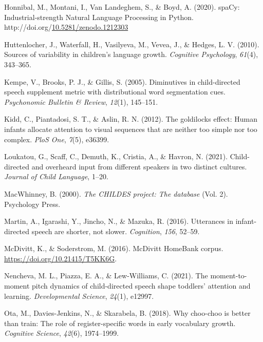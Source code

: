 \documentclass[10pt, letterpaper]{article}
\newenvironment{CSLReferences}%
  {}%
  {\par}
\begin{document}
\begin{CSLReferences}{1}{0}
\leavevmode\hypertarget{ref-honnibal2020spacy}{}%
Honnibal, M., Montani, I., Van Landeghem, S., \& Boyd, A. (2020).
{spaCy: Industrial-strength Natural Language Processing in Python}.
http://doi.org/\href{https://doi.org/10.5281/zenodo.1212303}{10.5281/zenodo.1212303}

\leavevmode\hypertarget{ref-huttenlocher2010sources}{}%
Huttenlocher, J., Waterfall, H., Vasilyeva, M., Vevea, J., \& Hedges, L.
V. (2010). Sources of variability in children's language growth.
\emph{Cognitive Psychology}, \emph{61}(4), 343--365.

\leavevmode\hypertarget{ref-kempe2005diminutives}{}%
Kempe, V., Brooks, P. J., \& Gillis, S. (2005). Diminutives in
child-directed speech supplement metric with distributional word
segmentation cues. \emph{Psychonomic Bulletin \& Review}, \emph{12}(1),
145--151.

\leavevmode\hypertarget{ref-kidd2012goldilocks}{}%
Kidd, C., Piantadosi, S. T., \& Aslin, R. N. (2012). The goldilocks
effect: Human infants allocate attention to visual sequences that are
neither too simple nor too complex. \emph{PloS One}, \emph{7}(5),
e36399.

\leavevmode\hypertarget{ref-loukatou2021child}{}%
Loukatou, G., Scaff, C., Demuth, K., Cristia, A., \& Havron, N. (2021).
Child-directed and overheard input from different speakers in two
distinct cultures. \emph{Journal of Child Language}, 1--20.

\leavevmode\hypertarget{ref-macwhinney2000childes}{}%
MacWhinney, B. (2000). \emph{The CHILDES project: The database} (Vol.
2). Psychology Press.

\leavevmode\hypertarget{ref-martin2016utterances}{}%
Martin, A., Igarashi, Y., Jincho, N., \& Mazuka, R. (2016). Utterances
in infant-directed speech are shorter, not slower. \emph{Cognition},
\emph{156}, 52--59.

\leavevmode\hypertarget{ref-soderstromcorpus}{}%
McDivitt, K., \& Soderstrom, M. (2016). McDivitt HomeBank corpus.
\url{https://doi.org/10.21415/T5KK6G}.

\leavevmode\hypertarget{ref-nencheva2021moment}{}%
Nencheva, M. L., Piazza, E. A., \& Lew-Williams, C. (2021). The
moment-to-moment pitch dynamics of child-directed speech shape toddlers'
attention and learning. \emph{Developmental Science}, \emph{24}(1),
e12997.

\leavevmode\hypertarget{ref-ota2018choo}{}%
Ota, M., Davies-Jenkins, N., \& Skarabela, B. (2018). Why choo-choo is
better than train: The role of register-specific words in early
vocabulary growth. \emph{Cognitive Science}, \emph{42}(6), 1974--1999.


\end{CSLReferences}
\end{document}
